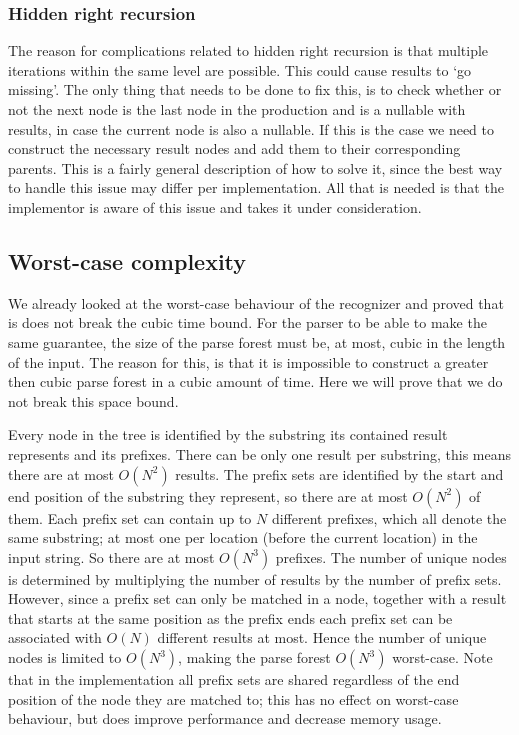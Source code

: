 \documentclass[a4paper,10pt]{article}
\begin{document}
\subsubsection{Hidden right recursion}
The reason for complications related to hidden right recursion is that multiple iterations within the same level are possible. This could cause results to `go missing'. The only thing that needs to be done to fix this, is to check whether or not the next node is the last node in the production and is a nullable with results, in case the current node is also a nullable. If this is the case we need to construct the necessary result nodes and add them to their corresponding parents. This is a fairly general description of how to solve it, since the best way to handle this issue may differ per implementation. All that is needed is that the implementor is aware of this issue and takes it under consideration.

\subsection{Worst-case complexity}
We already looked at the worst-case behaviour of the recognizer and proved that is does not break the cubic time bound. For the parser to be able to make the same guarantee, the size of the parse forest must be, at most, cubic in the length of the input. The reason for this, is that it is impossible to construct a greater then cubic parse forest in a cubic amount of time. Here we will prove that we do not break this space bound.

Every node in the tree is identified by the substring its contained result represents and its prefixes. There can be only one result per substring, this means there are at most $O(N^2)$ results. The prefix sets are identified by the start and end position of the substring they represent, so there are at most $O(N^2)$ of them. Each prefix set can contain up to $N$ different prefixes, which all denote the same substring; at most one per location (before the current location) in the input string. So there are at most $O(N^3)$ prefixes. The number of unique nodes is determined by multiplying the number of results by the number of prefix sets. However, since a prefix set can only be matched in a node, together with a result that starts at the same position as the prefix ends each prefix set can be associated with $O(N)$ different results at most. Hence the number of unique nodes is limited to $O(N^3)$, making the parse forest $O(N^3)$ worst-case. Note that in the implementation all prefix sets are shared regardless of the end position of the node they are matched to; this has no effect on worst-case behaviour, but does improve performance and decrease memory usage.
\end{document}
